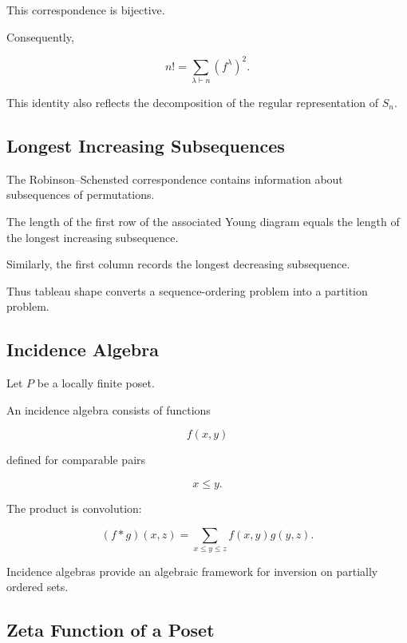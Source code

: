 This correspondence is bijective.

Consequently,

\[
\boxed{
n!
=
\sum_{\lambda\vdash n}
(f^\lambda)^2.
}
\]

This identity also reflects the decomposition of the regular
representation of \(S_n\).

\subsection{Longest Increasing Subsequences}
\label{subsec:longest-increasing-subsequences}

The Robinson--Schensted correspondence contains information about
subsequences of permutations.

The length of the first row of the associated Young diagram equals the
length of the longest increasing subsequence.

Similarly, the first column records the longest decreasing subsequence.

Thus tableau shape converts a sequence-ordering problem into a partition
problem.

\subsection{Incidence Algebra}
\label{subsec:incidence-algebra}

Let \(P\) be a locally finite poset.

An incidence algebra consists of functions

\[
f(x,y)
\]

defined for comparable pairs

\[
x\leq y.
\]

The product is convolution:

\[
\boxed{
(f*g)(x,z)
=
\sum_{x\leq y\leq z}
f(x,y)g(y,z).
}
\]

Incidence algebras provide an algebraic framework for inversion on
partially ordered sets.

\subsection{Zeta Function of a Poset}
\label{subsec:zeta-function-poset}

